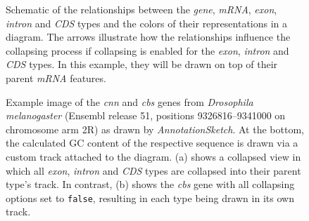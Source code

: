 \documentclass[a4paper]{scrreprt}
\begin{document}
\begin{figure}
\caption{Schematic of the relationships between the \emph{gene}, \emph{mRNA}, \emph{exon}, \emph{intron} and \emph{CDS} types and the colors of their representations in a diagram. The arrows illustrate how the relationships influence the collapsing process if collapsing is enabled for the \emph{exon}, \emph{intron} and \emph{CDS} types. In this example, they will be drawn on top of their parent \emph{mRNA} features.}
\label{collapsetypes}
\end{figure}
\begin{figure}
\caption{Example image of the \emph{cnn} and \emph{cbs} genes from \emph{Drosophila melanogaster} (Ensembl release 51, positions 9326816--9341000 on chromosome arm 2R) as drawn by \emph{AnnotationSketch}. At the bottom, the calculated GC content of the respective sequence is drawn via a custom track attached to the diagram. (a) shows a collapsed view in which all \emph{exon}, \emph{intron} and \emph{CDS} types are collapsed into their parent type's track. In contrast, (b) shows the \emph{cbs} gene with all collapsing options set to \texttt{false}, resulting in each type being drawn in its own track.}
\label{cnn_large}
\end{figure}
\end{document}
